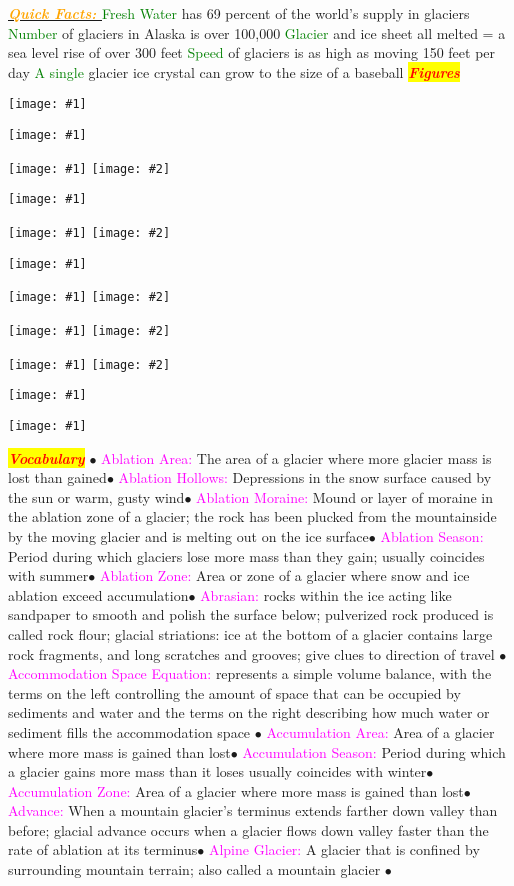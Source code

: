 \documentclass{article}
\newcommand{\ddd}{$\bullet$}
\newcommand{\red}[1]{\textcolor{red}{#1}}
\newcommand{\green}[1]{\textcolor{green}{#1}}
\newcommand{\pink}[1]{\textcolor{magenta}{#1}}
\newcommand{\orange}[1]{\textcolor{orange}{#1}}
\newcommand{\mysection}[1]{\colorbox{yellow}{\textbf{\textit{\red{#1}}}}}
\newcommand{\mysub}[1]{\underline{\textbf{{\textit{\orange{#1}}}}}}
\newcommand{\mysubsub}[1]{{{\green{#1}}}}
\newcommand{\vocab}[1]{{\pink{#1}}}
\newcommand{\fig}[1]{
	\texttt{[image: \#1]}
}
\newcommand{\figwidth}[2]{
	\texttt{[image: \#1]}
}
\newcommand{\figtwo}[2]{
	\texttt{[image: \#1]}
	\texttt{[image: \#2]}
}
\begin{document}
\begin{multicols*}{4}
		    \mysub{Quick Facts: }
		    \mysubsub{Fresh Water} has 69 percent of the world's supply in glaciers
		    \mysubsub{Number} of glaciers in Alaska is over 100,000
		    \mysubsub{Glacier} and ice sheet all melted = a sea level rise of over 300 feet
		    \mysubsub{Speed} of glaciers is as high as moving 150 feet per day
		    \mysubsub{A single} glacier ice crystal can grow to the size of a baseball
	\mysection{Figures}
	\fig{iceshelf_locations}
	\fig{othersea}
	\figtwo{arctic}{lgm}
	\fig{na}
	\figtwo{corrie}{milan}
	\fig{seaice}
	\figtwo{southern}{greenland}
	\figtwo{fjord}{glacier}
	\figtwo{lauren}{cordi}
	\fig{wordlmap}
	\figwidth{filler}{5}
	\pagebreak
	
	\mysection{Vocabulary} 
		\ddd
		\vocab{        Ablation Area: } The area of a glacier where more glacier mass is lost than gained\ddd
		\vocab{        Ablation Hollows: } Depressions in the snow surface caused by the sun or warm, gusty wind\ddd
		\vocab{        Ablation Moraine: } Mound or layer of moraine in the ablation zone of a glacier; the rock has been plucked from the mountainside by the moving glacier and is melting out on the ice surface\ddd
		\vocab{        Ablation Season: } Period during which glaciers lose more mass than they gain; usually coincides with summer\ddd
		\vocab{        Ablation Zone: } Area or zone of a glacier where snow and ice ablation exceed accumulation\ddd
		\vocab{Abrasian: } rocks within the ice acting like sandpaper to smooth and polish the surface below; pulverized rock produced is called rock flour; glacial striations: ice at the bottom of a glacier contains large rock fragments, and long scratches and grooves; give clues to direction of travel \ddd
		\vocab{Accommodation Space Equation:} represents a simple volume balance, with the terms on the left controlling the amount of space that can be occupied by sediments and water and the terms on the right describing how much water or sediment fills the accommodation space \ddd
		\vocab{        Accumulation Area: } Area of a glacier where more mass is gained than lost\ddd
		\vocab{        Accumulation Season: } Period during which a glacier gains more mass than it loses usually coincides with winter\ddd
		\vocab{        Accumulation Zone: } Area of a glacier where more mass is gained than lost\ddd
		\vocab{        Advance: } When a mountain glacier’s terminus extends farther down valley than before; glacial advance occurs when a glacier flows down valley faster than the rate of ablation at its terminus\ddd
		\vocab{        Alpine Glacier: } A glacier that is confined by surrounding mountain terrain; also called a mountain glacier \ddd

\end{multicols*}
\end{document}
